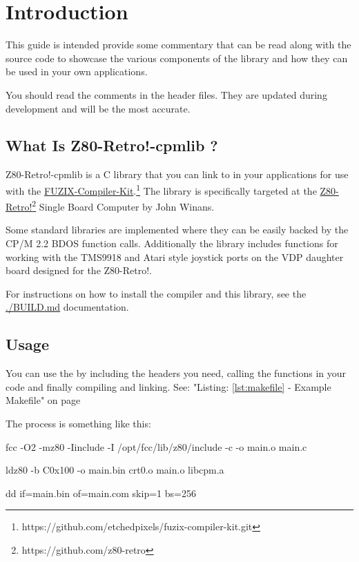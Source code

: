 \documentclass[10pt,a4paper,hidelinks]{article}
\title{\lib}
\author{David Latham}
\date{September, 2025}
\def\lib{Z80-Retro!-cpmlib }
\begin{document}
\maketitle
\tableofcontents
\pagebreak
\section{Introduction}

This guide is intended provide some commentary that can be read along with the
source code to showcase the various components of the library and how they can
be used in your own applications.

You should read the comments in the header files.  They are updated during
development and will be the most accurate.

\subsection{What Is \lib?}

\lib is a C library that you can link to in your applications for
use with the
\href{https://github.com/etchedpixels/fuzix-compiler-kit.git}{FUZIX-Compiler-Kit}.\footnote{https://github.com/etchedpixels/fuzix-compiler-kit.git}
The library is specifically targeted at the
\href{https://github.com/z80-retro}{Z80-Retro!}\footnote{https://github.com/z80-retro} Single Board Computer by John
Winans.

Some standard libraries are implemented where they can be easily backed by the
CP/M 2.2 BDOS function calls.  Additionally the library includes functions for
working with the TMS9918 and Atari style joystick ports on the VDP daughter
board designed for the Z80-Retro!.

For instructions on how to install the compiler and this library, see the
\url{./BUILD.md} documentation.

\subsection{Usage}

You can use the by including the headers you need, calling the functions in
your code and finally compiling and linking. See: "Listing: \ref{lst:makefile}
- Example Makefile" on page \pageref{lst:makefile}

The process is something like this:

\begin{description}[font=$\bullet$~\normalfont\scshape\color{red!50!black}]
  \item[Compile] fcc -O2 -mz80 -Iinclude -I /opt/fcc/lib/z80/include -c -o
    main.o main.c
  \item[Link] ldz80 -b C0x100 -o main.bin crt0.o main.o libcpm.a
  \item[Truncate] dd if=main.bin of=main.com skip=1 bs=256
\end{description}
\end{document}
